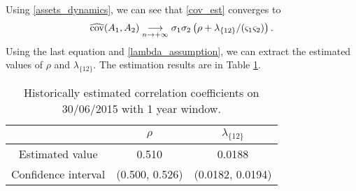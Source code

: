 Using \eqref{assets_dynamics}, we can see that \eqref{cov_est} converges to
\begin{equation}
	\widehat{\operatorname{cov}}(A_1, A_2) \underset{n \to +\infty}{\longrightarrow} \sigma_1 \sigma_2 \left( \rho+ \lambda_{\{12\}} /(\varsigma_1 \varsigma_2) \right).
\end{equation}
Using the last equation and \eqref{lambda_assumption}, we can extract the estimated values of $\rho$ and $\lambda_{\{12\}}$. The estimation results are in Table \ref{table:corr_params}.
\begin{table}[H]
	\begin{center}
		\begin{tabular}{| c | c | c | }
			\hline
			& $\rho$ & $\lambda_{\{12\}} $ \\
			\hline
			Estimated value & 0.510 & 0.0188 \\
			\hline
			Confidence interval \footnotemark & (0.500, 0.526)& (0.0182, 0.0194) \\
			\hline
		\end{tabular}
		\caption{Historically estimated correlation coefficients on 30/06/2015 with 1 year window.}
		\label{table:corr_params}	
	\end{center}
\end{table}

